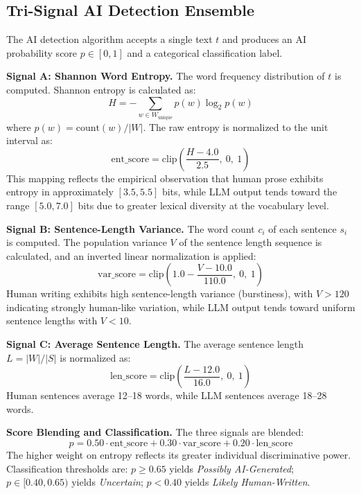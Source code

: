 \documentclass[conference]{IEEEtran}
\begin{document}
\subsection{Tri-Signal AI Detection Ensemble}

The AI detection algorithm accepts a single text $t$ and produces an AI
probability score $p \in [0, 1]$ and a categorical classification label.

\textbf{Signal A: Shannon Word Entropy.} The word frequency distribution of
$t$ is computed. Shannon entropy \cite{shannon1948entropy} is calculated as:
\begin{equation}
  H = -\sum_{w \in W_{\text{unique}}} p(w) \log_2 p(w)
\end{equation}
where $p(w) = \text{count}(w) / |W|$. The raw entropy is normalized to the
unit interval as:
\begin{equation}
  \text{ent\_score} = \text{clip}\!\left(\frac{H - 4.0}{2.5},\ 0,\ 1\right)
\end{equation}
This mapping reflects the empirical observation that human prose exhibits
entropy in approximately $[3.5, 5.5]$ bits, while LLM output tends toward the
range $[5.0, 7.0]$ bits due to greater lexical diversity at the vocabulary
level.

\textbf{Signal B: Sentence-Length Variance.} The word count $c_i$ of each
sentence $s_i$ is computed. The population variance $V$ of the sentence length
sequence is calculated, and an inverted linear normalization is applied:
\begin{equation}
  \text{var\_score} = \text{clip}\!\left(1.0 - \frac{V - 10.0}{110.0},\ 0,\ 1\right)
\end{equation}
Human writing exhibits high sentence-length variance (burstiness), with
$V > 120$ indicating strongly human-like variation, while LLM output tends
toward uniform sentence lengths with $V < 10$.

\textbf{Signal C: Average Sentence Length.} The average sentence length $L =
|W| / |S|$ is normalized as:
\begin{equation}
  \text{len\_score} = \text{clip}\!\left(\frac{L - 12.0}{16.0},\ 0,\ 1\right)
\end{equation}
Human sentences average 12--18 words, while LLM sentences average 18--28
words.

\textbf{Score Blending and Classification.} The three signals are blended:
\begin{equation}
  p = 0.50 \cdot \text{ent\_score} + 0.30 \cdot \text{var\_score}
        + 0.20 \cdot \text{len\_score}
\end{equation}
The higher weight on entropy reflects its greater individual discriminative
power. Classification thresholds are: $p \geq 0.65$ yields \textit{Possibly
AI-Generated}; $p \in [0.40, 0.65)$ yields \textit{Uncertain}; $p < 0.40$
yields \textit{Likely Human-Written}.
\end{document}
